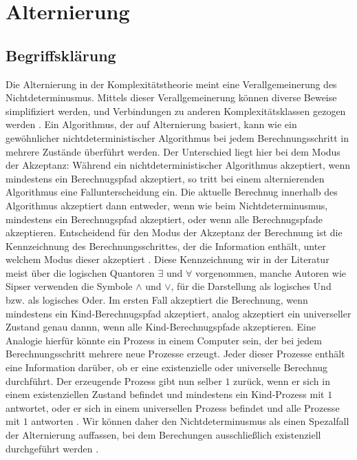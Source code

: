 \chapter{Alternierung} \label{chapter: Alternierung}

\section{Begriffsklärung} \label{section: Begriffsklärung}
Die Alternierung in der Komplexitätstheorie meint eine Verallgemeinerung des Nichtdeterminusmus. Mittels dieser Verallgemeinerung 
können diverse Beweise simplifiziert werden, und Verbindungen zu anderen Komplexitätsklassen gezogen werden \cite{sipser_introduction_2012} \cite{chandra_alternation_1976}. Ein Algorithmus, der auf Alternierung basiert,
kann wie ein gewöhnlicher nichtdeterministischer Algorithmus bei jedem Berechnungsschritt in mehrere Zustände überführt werden. Der Unterschied liegt hier bei dem Modus der Akzeptanz:
Während ein nichtdeterministischer Algorithmus akzeptiert, wenn mindestens ein Berechnugspfad akzeptiert, so tritt bei einem alternierenden Algorithmus eine Fallunterscheidung ein.
Die aktuelle Berechnug innerhalb des Algorithmus akzeptiert dann entweder, wenn wie beim Nichtdeterminusmus, mindestens ein Berechnugspfad akzeptiert, oder wenn alle Berechnugspfade akzeptieren.
Entscheidend für den Modus der Akzeptanz der Berechnung ist die Kennzeichnung des Berechnungsschrittes, der die Information enthält, unter welchem Modus dieser akzeptiert \cite{sipser_introduction_2012}.
Diese Kennzeichnung wir in der Literatur meist über die logischen Quantoren $\exists$ und $\forall$ vorgenommen, manche Autoren wie Sipser verwenden die Symbole $\land$ und $\lor$, für die Darstellung als logisches Und bzw. als logisches Oder.
Im ersten Fall akzeptiert die Berechnung, wenn mindestens ein Kind-Berechnugspfad akzeptiert, analog akzeptiert ein universeller Zustand genau dannn, wenn alle Kind-Berechnugspfade akzeptieren.
Eine Analogie hierfür könnte ein Prozess in einem Computer sein, der bei jedem Berechnungsschritt mehrere neue Prozesse erzeugt.
Jeder dieser Prozesse enthält eine Information darüber, ob er eine existenzielle oder universelle Berechnug durchführt. Der erzeugende Prozess gibt nun selber $1$ zurück, wenn er sich in einem existenziellen Zustand befindet
und mindestens ein Kind-Prozess mit $1$ antwortet, oder er sich in einem universellen Prozess befindet und alle Prozesse mit $1$ antworten \cite{sipser_introduction_2012}.
Wir können daher den Nichtdeterminusmus als einen Spezalfall der Alternierung auffassen, bei dem Berechungen ausschließlich existenziell durchgeführt werden \cite{chandra_alternation_1976}.


